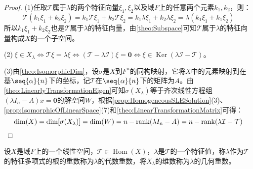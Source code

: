 \begin{proof}
	(1)任取$\mathcal{T}$属于$\lambda$的两个特征向量$\xi_1,\xi_2$以及域$F$上的任意两个元素$k_1,k_2$，则：
	\begin{equation*}
		\mathcal{T}(k_1\xi_1+k_2\xi_2)=k_1\mathcal{T}\xi_1+k_2\mathcal{T}\xi_2=k_1\lambda\xi_1+k_2\lambda\xi_2=\lambda(k_1\xi_1+k_1\xi_2)
	\end{equation*}
	所以$k_1\xi_1+k_2\xi_2$也是$\mathcal{T}$属于$\lambda$的特征向量，由\cref{theo:Subspace}可知$\mathcal{T}$属于$\lambda$的特征向量构成$X$的一个子空间。\par
	(2)$\;\xi\in X_{\lambda}\iff\mathcal{T}\xi=\lambda\xi\iff(\mathcal{T}-\lambda\mathcal{I})\xi=\mathbf{0}\iff\xi\in\operatorname{Ker}(\lambda\mathcal{I}-\mathcal{T})$。\par
	(3)由\cref{theo:IsomorphicDim}，设$\sigma$是$X$到$F^n$的同构映射，它将$X$中的元素映射到在基$\seq{\alpha}{n}$下的坐标，记$\mathcal{T}$在$\seq{\alpha}{n}$下的矩阵为$A$。由\cref{theo:LinearlyTransformationEigen}可知$\sigma(X_{\lambda})$等于齐次线性方程组$(\lambda I_n-A)x=\mathbf{0}$的解空间$W$，根据\cref{prop:HomogeneousSLESolution}(3)、\cref{prop:IsomorphicOfLinearSpace}(7)和\cref{theo:LinearTransformationMatrix}可得：
	\begin{equation*}
		\dim(X)=\dim[\sigma(X_\lambda)]=\dim(W)=n-\operatorname{rank}(\lambda I_n-A)=n-\operatorname{rank}(\lambda\mathcal{I}-\mathcal{T})\qedhere
	\end{equation*}
\end{proof}
\begin{definition}
	设$X$是域$F$上的一个线性空间，$\mathcal{T}\in\operatorname{Hom}(X)$，$\lambda$是$\mathcal{T}$的一个特征值，称$\lambda$作为$\mathcal{T}$的特征多项式的根的重数称为$\lambda$的代数重数，将$X_{\lambda}$的维数称为$\lambda$的几何重数。
\end{definition}

